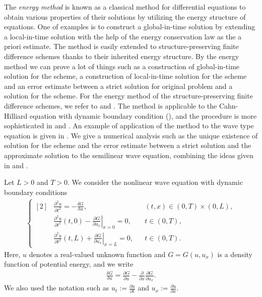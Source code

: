 \documentclass[dvipdfmx-if-dvi,autodetect-engine,ja=standard]{amsart}
\numberwithin{equation}{section} %
\begin{document}
The \emph{energy method} is known as a classical method for differential equations to obtain various properties of their solutions by utilizing the energy structure of equations. 
One of examples is to construct a global-in-time solution by extending a local-in-time solution 
with the help of the energy conservation law as the a priori estimate. 
The method is easily extended to structure-preserving finite difference schemes thanks to their 
inherited energy structure. 
By the energy method we can prove a lot of things such as a construction of global-in-time solution 
for the scheme, a construction of local-in-time solution for the scheme and an error estimate 
between a strict solution for original problem and a solution for the scheme.  
For the energy method of the structure-preserving finite difference schemes, we refer to 
\cite{yo2} and \cite{3}. 
The method is applicable to the Cahn-Hilliard equation with dynamic boundary condition
(\cite{4}), and the procedure is more sophisticated in \cite{fu-ok} and \cite{5}. 
An example of application of the method to the wave type equation is given in \cite{ya-yo}. 
We give a numerical analysis such as the unique existence of solution for the scheme and the error estimate between a strict solution and the approximate solution to the semilinear wave equation, 
combining the ideas given in \cite{5} and \cite{ya-yo}. 

Let
$L>0$
and
$T>0$.
We consider
the nonlinear wave equation with
dynamic boundary conditions
\begin{align}\label{eq:ndw}
    \left\{ \begin{aligned}[2]
    &\frac{\partial^2 u}{\partial t^2} = - \frac{\delta G}{\delta u},
    &&(t,x) \in (0,T)\times (0,L),\\
    &\frac{\partial^2 u}{\partial t^2}(t,0)
    - \left. \frac{\partial G}{\partial u_x}\right|_{x=0} = 0,
    &&t\in (0,T),\\
    &\frac{\partial^2 u}{\partial t^2}(t,L)
    + \left. \frac{\partial G}{\partial u_x}\right|_{x=L} = 0,
    &&t\in (0,T).
    \end{aligned}\right.
\end{align}
Here,
$u$
denotes a real-valued unknown function
and
$G = G(u,u_x)$
is a density function of potential energy,
and we write
\begin{align}
    \frac{\delta G}{\delta u}
    = \frac{\partial G}{\partial u} - \frac{\partial}{\partial x} \frac{\partial G}{\partial u_x}.
\end{align}
We also used the notation such as $u_t:= \frac{\partial u}{\partial t}$ and $u_x := \frac{\partial u}{\partial x}$.
\end{document}
